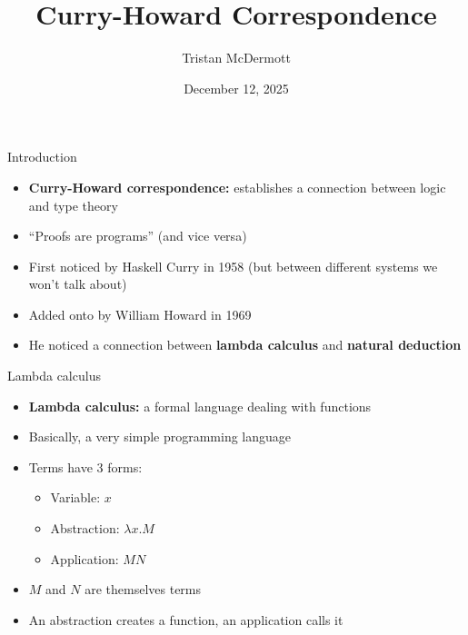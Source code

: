 \documentclass{beamer}
\title{Curry-Howard Correspondence}
\author{Tristan McDermott}
\institute{Advisor: Tibor Beke}
\date{December 12, 2025}
\begin{document}
\frame{\titlepage}

\begin{frame}{Introduction}
    \begin{itemize}
        \item \textbf{Curry-Howard correspondence:} establishes a connection between logic and type theory
        \item ``Proofs are programs'' (and vice versa)
        \item First noticed by Haskell Curry in 1958 (but between different systems we won't talk about)
        \item Added onto by William Howard in 1969
        \item He noticed a connection between \textbf{lambda calculus} and \textbf{natural deduction}
    \end{itemize}
\end{frame}

\begin{frame}{Lambda calculus}
    \begin{itemize}
        \item \textbf{Lambda calculus:} a formal language dealing with functions
        \item Basically, a very simple programming language
        \item Terms have 3 forms:
        \begin{itemize}
            \item Variable: $x$
            \item Abstraction: $\lambda x. M$
            \item Application: $M N$
        \end{itemize}
        \item $M$ and $N$ are themselves terms
        \item An abstraction creates a function, an application calls it
    \end{itemize}
\end{frame}
\end{document}
